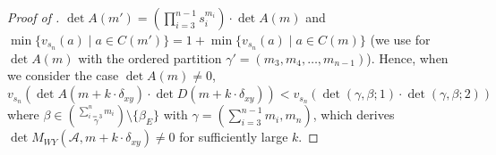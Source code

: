 \documentclass[12pt]{amsart}
\theoremstyle{definition}
\newcommand{\AAA}{\mathcal{A}}
\begin{document}
\begin{proof}[Proof of ]
$\det A(m')= (\prod_{i=3}^{n-1}s_i^{m_i})\cdot\det A(m)$ and 
$\min\{v_{s_n}(a) \mid a\in C(m')\}=1+\min\{v_{s_n}(a) \mid a\in C(m)\}$ 
(we use  for $\det A(m)$ with the ordered partition $\gamma'=(m_3,m_4,\ldots,m_{n-1})$). 
Hence, when we consider the case $\det A(m)\neq0$, 
$v_{s_n}(\det A(m+k\cdot\delta_{xy}) \cdot \det D(m+k\cdot\delta_{xy}))
< v_{s_n}(\det(\gamma,\beta;1)\cdot\det(\gamma,\beta;2) )$
where $\beta\in\binom{\sum_{i=3}^{n}m_i}{\gamma}\setminus\{\beta_E\}$
with $\gamma=(\sum_{i=3}^{n-1}m_i, m_n)$, 
which derives 
$\det M_{WY}(\AAA, m+k\cdot\delta_{x y})\neq0$ for sufficiently large $k$. 
\end{proof}

\end{document}
